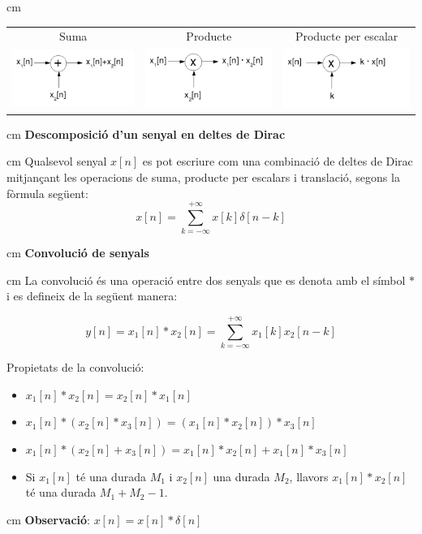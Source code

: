 \documentclass{article}
\begin{document}
 cm
\begin{center}
\begin{tabular}{ccc}
Suma & Producte & Producte per escalar \\
\begin{minipage}{5cm}\includegraphics[width=5cm]{diagramasuma.png}\end{minipage} & 
\begin{minipage}{5cm}\includegraphics[width=5cm]{diagramaproducte.png}\end{minipage} & 
\begin{minipage}{5cm}\includegraphics[width=5cm]{diagramaproducteesc.png}\end{minipage} 
\end{tabular}
\end{center}

 cm
\noindent
\textbf{Descomposici\'o d'un senyal en deltes de Dirac}

 cm
\noindent
Qualsevol senyal $x[n]$ es pot escriure com una combinaci\'o de deltes
de Dirac mitjan\c{c}ant les operacions de suma, producte per escalars i
translaci\'o, segons la f\`ormula seg\"uent:
\[
x[n]=\sum_{k=-\infty}^{+\infty} x[k] \delta[n-k]
\]


 cm
\noindent
\textbf{Convoluci\'o de senyals} 

 cm
\noindent
La convoluci\'o \'es una operaci\'o entre dos senyals que es denota amb el s\'imbol $*$
i es defineix de la seg\"uent manera:

\[
y[n]=x_1[n] * x_2[n]=\sum_{k=-\infty}^{+\infty} x_1[k] x_2[n-k] 
\]

\noindent
Propietats de la convoluci\'o:
\begin{itemize}
\item $x_1[n] * x_2[n] = x_2[n] * x_1[n]$
\item $x_1[n] * (x_2[n] * x_3[n])=(x_1[n] * x_2[n]) * x_3[n]$
\item $x_1[n] * (x_2[n] + x_3[n]) = x_1[n] * x_2[n] + x_1[n] * x_3[n]$
\item Si $x_1[n]$ t\'e una durada $M_1$ i $x_2[n]$ una durada $M_2$, llavors
$x_1[n] * x_2[n]$ t\'e una durada $M_1+M_2-1$.
\end{itemize}

 cm
\noindent
\textbf{Observaci\'o}: $x[n]=x[n] * \delta[n]$
\end{document}
